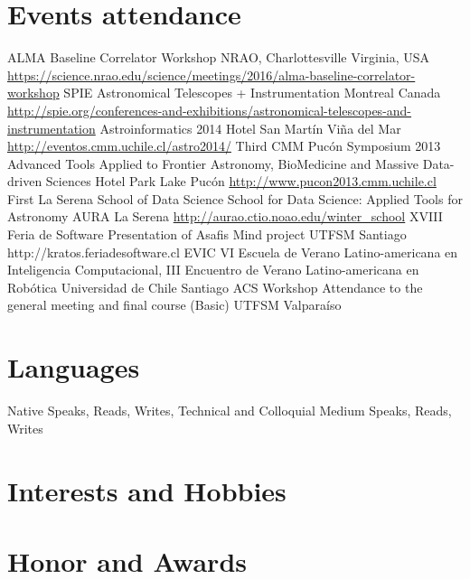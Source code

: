 \documentclass[11pt,a4paper]{moderncv}
\begin{document}
\section{Events attendance}
	{ALMA Baseline Correlator Workshop}
	{}
	{NRAO, Charlottesville}
	{Virginia, USA}
	{\url{https://science.nrao.edu/science/meetings/2016/alma-baseline-correlator-workshop}}
	{SPIE Astronomical Telescopes + Instrumentation}
	{}
	{Montreal}
	{Canada}
	{\url{http://spie.org/conferences-and-exhibitions/astronomical-telescopes-and-instrumentation}}
	{Astroinformatics 2014}
	{}
	{Hotel San Martín}
	{Viña del Mar}
	{\url{http://eventos.cmm.uchile.cl/astro2014/}}
	{Third CMM Pucón Symposium 2013}
	{Advanced Tools Applied to Frontier Astronomy, BioMedicine and Massive Data-driven Sciences}
	{Hotel Park Lake}
	{Pucón}
	{\url{http://www.pucon2013.cmm.uchile.cl}}
	{First La Serena School of Data Science}
	{School for Data Science: Applied Tools for Astronomy}
	{AURA}
	{La Serena}
	{\url{http://aurao.ctio.noao.edu/winter_school}}
	{XVIII Feria de Software}
	{Presentation of Asafis Mind project}
	{UTFSM}
	{Santiago}
	{http://kratos.feriadesoftware.cl}
	{EVIC}
	{VI Escuela de Verano Latino-americana en Inteligencia Computacional, III Encuentro de Verano Latino-americana en Robótica}
	{Universidad de Chile}
	{Santiago}
	{}
	{ACS Workshop}
	{Attendance to the general meeting and final course (Basic)}
	{UTFSM}
	{Valparaíso}
	{}

\section{Languages}
	{Native}
	{Speaks, Reads, Writes, Technical and Colloquial}
	{Medium}
	{Speaks, Reads, Writes}

\section{Interests and Hobbies}

\section{Honor and Awards}
\end{document}
